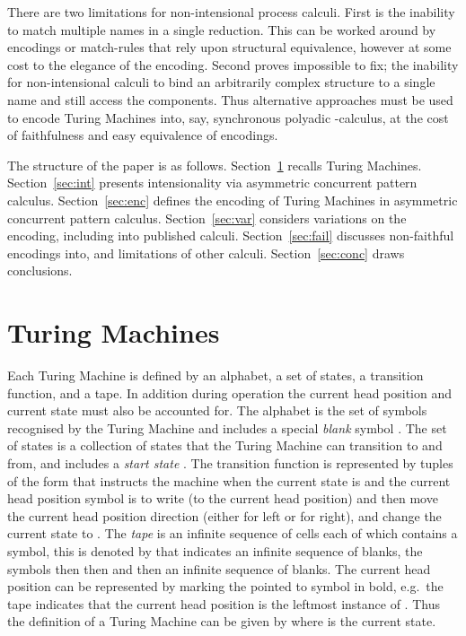 \documentclass[submission,copyright,creativecommons]{eptcs}
\begin{document}
There are two limitations for non-intensional process calculi.
First is the inability to match multiple names in a single reduction.
This can be worked around by encodings or match-rules that rely upon structural equivalence,
however at some cost to the elegance of the encoding.
Second proves impossible to fix; the inability for non-intensional calculi to bind
an arbitrarily complex structure to a single name and still access the components.
Thus alternative approaches must be used to encode Turing Machines into, say,
synchronous polyadic -calculus, at the cost of faithfulness and easy equivalence
of encodings.


\medskip

The structure of the paper is as follows.
Section~\ref{sec:tm} recalls Turing Machines.
Section~\ref{sec:int} presents intensionality via asymmetric concurrent pattern calculus.
Section~\ref{sec:enc} defines the encoding of Turing Machines in asymmetric concurrent pattern calculus.
Section~\ref{sec:var} considers variations on the encoding, including into published calculi.
Section~\ref{sec:fail} discusses non-faithful encodings into, and limitations of other calculi.
Section~\ref{sec:conc} draws conclusions.

\section{Turing Machines}
\label{sec:tm}


Each Turing Machine is defined by an alphabet, a set of states, a transition function,
and a tape. In addition during operation the current head position and current state
must also be accounted for.
The alphabet  is the set of symbols  recognised by the Turing Machine and includes
a special {\em blank} symbol .
The set of states  is a collection of states  that the Turing Machine can transition
to and from, and includes a {\em start state} .
The transition function  is represented by tuples of the form
 that instructs the machine when the current state is  and the
current head position symbol is  to write (to the current head position)  and
then move the current head position direction  (either  for left or  for right),
and change the current state to .
The {\em tape}  is an infinite sequence of cells each of which contains a symbol,
this is denoted by  that indicates an infinite sequence
of blanks, the symbols  then  then  and then an infinite sequence of blanks.
The current head position can be represented by marking the pointed to symbol in bold,
e.g.~the tape  indicates that the current head position is
the leftmost instance of .
Thus the definition of a Turing Machine can be given by
 where
 is the current state.
\end{document}
